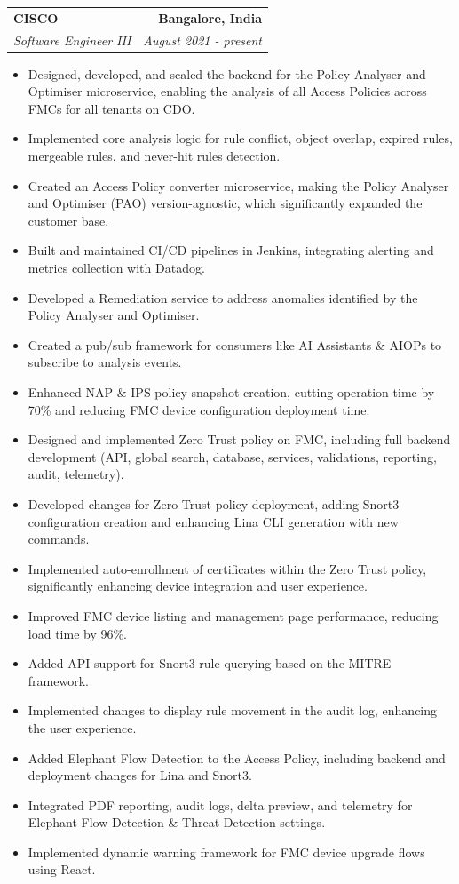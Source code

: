 \documentclass[letterpaper,11pt]{article}
\makeatletter
\newcommand{\resumeItem}[1]{
  \item\small{
    {#1 \vspace{-2pt}}
  }
}
\newcommand{\resumeSubheading}[4]{
  \vspace{-2pt}\item
    \begin{tabular*}{1.0\textwidth}[t]{l@{\extracolsep{\fill}}r}
      \textbf{#1} & \textbf{\small #2} \\
      \textit{\small#3} & \textit{\small #4} \\
    \end{tabular*}\vspace{-7pt}
}
\newcommand{\resumeItemListStart}{\begin{itemize}}
\newcommand{\resumeItemListEnd}{\end{itemize}\vspace{-5pt}}
\makeatother
\begin{document}
\resumeSubheading
{CISCO}{Bangalore, India}
{Software Engineer III}{August 2021 - present}
\resumeItemListStart
\resumeItem{Designed, developed, and scaled the backend for the Policy Analyser and Optimiser microservice, enabling the analysis of all Access Policies across FMCs for all tenants on CDO.}
\resumeItem{Implemented core analysis logic for rule conflict, object overlap, expired rules, mergeable rules, and never-hit rules detection.}
\resumeItem{Created an Access Policy converter microservice, making the Policy Analyser and Optimiser (PAO) version-agnostic, which significantly expanded the customer base.
}
\resumeItem{Built and maintained CI/CD pipelines in Jenkins, integrating alerting and metrics collection with Datadog.}
\resumeItem{Developed a Remediation service to address anomalies identified by the Policy Analyser and Optimiser.}
\resumeItem{Created a pub/sub framework for consumers like AI Assistants \& AIOPs to subscribe to analysis events.}
\resumeItem{Enhanced NAP \& IPS policy snapshot creation, cutting operation time by 70\% and reducing FMC device configuration deployment time.}
\resumeItem{Designed and implemented Zero Trust policy on FMC, including full backend development (API, global search, database, services, validations, reporting, audit, telemetry).}
\resumeItem{Developed changes for Zero Trust policy deployment, adding Snort3 configuration creation and enhancing Lina CLI generation with new commands.}
\resumeItem{Implemented auto-enrollment of certificates within the Zero Trust policy, significantly enhancing device integration and user experience.}
\resumeItem{Improved FMC device listing and management page performance, reducing load time by 96\%.}
\resumeItem{Added API support for Snort3 rule querying based on the MITRE framework.}
\resumeItem{Implemented changes to display rule movement in the audit log, enhancing the user experience.}
\resumeItem{Added Elephant Flow Detection to the Access Policy, including backend and deployment changes for Lina and Snort3.}
\resumeItem{Integrated PDF reporting, audit logs, delta preview, and telemetry for Elephant Flow Detection \& Threat Detection settings.}
\resumeItem{Implemented dynamic warning framework for FMC device upgrade flows using React.}
\resumeItemListEnd

\end{document}
